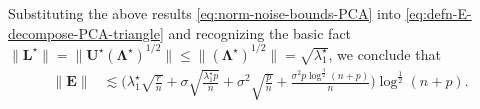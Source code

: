 Substituting the above results \eqref{eq:norm-noise-bounds-PCA} into \eqref{eq:defn-E-decompose-PCA-triangle} and recognizing the basic fact
$\|\bm{L}^{\star}\|=\|\bm{U}^{\star}(\bm{\Lambda}^{\star})^{1/2}\|\leq\|(\bm{\Lambda}^{\star})^{1/2}\|=\sqrt{\lambda_{1}^{\star}}$,
we conclude that
%
\begin{align*}
	\|\bm{E}\| & \lesssim\Bigg(\lambda_{1}^{\star}\sqrt{\frac{r}{n}}+\sigma\sqrt{\frac{\lambda_{1}^{\star}p}{n}}+\sigma^{2}\sqrt{\frac{p}{n}} + \frac{\sigma^2 p\log^{\frac{3}{2}}(n+p)}{n} \Bigg)\log^{\frac{1}{2}}(n+p).
\end{align*}
%



